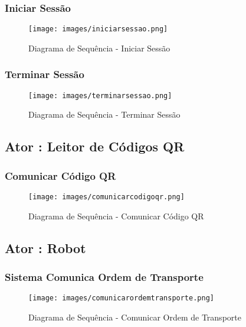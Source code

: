 \documentclass[11pt]{article}
\begin{document}
\subsubsection{Iniciar Sessão}

\begin{figure}[htb]
    \centering
    \texttt{[image: images/iniciarsessao.png]}
    \caption{Diagrama de Sequência - Iniciar Sessão}
    \label{fig:my_label2}
\end{figure}

\subsubsection{Terminar Sessão}

\begin{figure}[htb]
    \centering
    \texttt{[image: images/terminarsessao.png]}
    \caption{Diagrama de Sequência - Terminar Sessão}
    \label{fig:my_label3}
\end{figure}

\clearpage

\subsection{Ator : Leitor de Códigos QR}

\subsubsection{Comunicar Código QR}

\begin{figure}[htb]
    \centering
    \texttt{[image: images/comunicarcodigoqr.png]}
    \caption{Diagrama de Sequência - Comunicar Código QR}
    \label{fig:my_label3}
\end{figure}

\clearpage

\subsection{Ator : Robot}

\subsubsection{Sistema Comunica Ordem de Transporte}

\begin{figure}[htb]
    \centering
    \texttt{[image: images/comunicarordemtransporte.png]}
    \caption{Diagrama de Sequência - Comunicar Ordem de Transporte}
    \label{fig:my_label3}
\end{figure}
\end{document}
